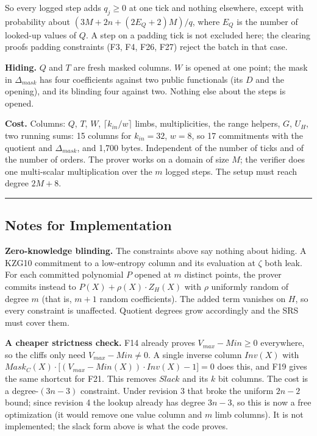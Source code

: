So every logged step adds \(q_j \ge 0\) at one tick and nothing elsewhere, except with probability about \((3M + 2n + (2E_Q+2)M)/q\), where \(E_Q\) is the number of looked-up values of \(Q\). A step on a padding tick is not excluded here; the clearing proof\textquotesingle s padding constraints (F3, F4, F26, F27) reject the batch in that case.

\textbf{Hiding.} \(Q\) and \(T\) are fresh masked columns. \(W\) is opened at one point; the mask in \(\Delta_{mask}\) has four coefficients against two public functionals (its \(D\) and the opening), and its blinding four against two. Nothing else about the steps is opened.

\textbf{Cost.} Columns: \(Q\), \(T\), \(W\), \(\lceil k_{in}/w \rceil\) limbs, multiplicities, the range helpers, \(G\), \(U_H\), two running sums: 15 columns for \(k_{in} = 32\), \(w = 8\), so 17 commitments with the quotient and \(\Delta_{mask}\), and 1,700 bytes. Independent of the number of ticks and of the number of orders. The prover works on a domain of size \(M\); the verifier does one multi-scalar multiplication over the \(m\) logged steps. The setup must reach degree \(2M + 8\).

\begin{center}\rule{0.5\linewidth}{0.5pt}\end{center}

\subsection{Notes for Implementation}

\textbf{Zero-knowledge blinding.} The constraints above say nothing about hiding. A KZG10 commitment to a low-entropy column and its evaluation at \(\zeta\) both leak. For each committed polynomial \(P\) opened at \(m\) distinct points, the prover commits instead to \(P(X) + \rho(X) \cdot Z_H(X)\) with \(\rho\) uniformly random of degree \(m\) (that is, \(m+1\) random coefficients). The added term vanishes on \(H\), so every constraint is unaffected. Quotient degrees grow accordingly and the SRS must cover them.

\textbf{A cheaper strictness check.} F14 already proves \(V_{max} - Min \ge 0\) everywhere, so the cliffs only need \(V_{max} - Min \ne 0\). A single inverse column \(Inv(X)\) with \(Mask_C(X) \cdot \big[(V_{max} - Min(X)) \cdot Inv(X) - 1\big] = 0\) does this, and F19 gives the same shortcut for F21. This removes \(Slack\) and its \(k\) bit columns. The cost is a degree-\((3n-3)\) constraint. Under revision 3 that broke the uniform \(2n-2\) bound; since revision 4 the lookup already has degree \(3n-3\), so this is now a free optimization (it would remove one value column and \(m\) limb columns). It is not implemented; the slack form above is what the code proves.


